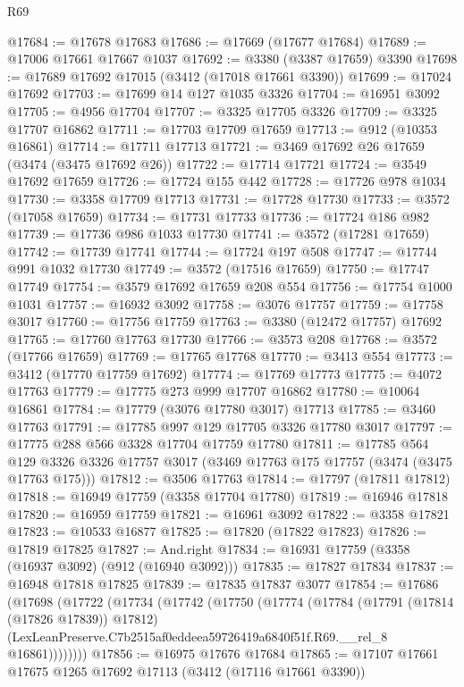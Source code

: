 \begin{lexlean}{R69}
\begin{coremodule}
@17684 := @17678 @17683
@17686 := @17669 (@17677 @17684)
@17689 := @17006 @17661 @17667 @1037
@17692 := @3380 (@3387 @17659) @3390
@17698 := @17689 @17692 @17015 (@3412 (@17018 @17661 @3390))
@17699 := @17024 @17692
@17703 := @17699 @14 @127 @1035 @3326
@17704 := @16951 @3092
@17705 := @4956 @17704
@17707 := @3325 @17705 @3326
@17709 := @3325 @17707 @16862
@17711 := @17703 @17709 @17659
@17713 := @912 (@10353 @16861)
@17714 := @17711 @17713
@17721 := @3469 @17692 @26 @17659 (@3474 (@3475 @17692 @26))
@17722 := @17714 @17721
@17724 := @3549 @17692 @17659
@17726 := @17724 @155 @442
@17728 := @17726 @978 @1034
@17730 := @3358 @17709 @17713
@17731 := @17728 @17730
@17733 := @3572 (@17058 @17659)
@17734 := @17731 @17733
@17736 := @17724 @186 @982
@17739 := @17736 @986 @1033 @17730
@17741 := @3572 (@17281 @17659)
@17742 := @17739 @17741
@17744 := @17724 @197 @508
@17747 := @17744 @991 @1032 @17730
@17749 := @3572 (@17516 @17659)
@17750 := @17747 @17749
@17754 := @3579 @17692 @17659 @208 @554
@17756 := @17754 @1000 @1031
@17757 := @16932 @3092
@17758 := @3076 @17757
@17759 := @17758 @3017
@17760 := @17756 @17759
@17763 := @3380 (@12472 @17757) @17692
@17765 := @17760 @17763 @17730
@17766 := @3573 @208
@17768 := @3572 (@17766 @17659)
@17769 := @17765 @17768
@17770 := @3413 @554
@17773 := @3412 (@17770 @17759 @17692)
@17774 := @17769 @17773
@17775 := @4072 @17763
@17779 := @17775 @273 @999 @17707 @16862
@17780 := @10064 @16861
@17784 := @17779 (@3076 @17780 @3017) @17713
@17785 := @3460 @17763
@17791 := @17785 @997 @129 @17705 @3326 @17780 @3017
@17797 := @17775 @288 @566 @3328 @17704 @17759 @17780
@17811 := @17785
    @564
    @129
    @3326
    @3326
    @17757
    @3017
    (@3469 @17763 @175 @17757 (@3474 (@3475 @17763 @175)))
@17812 := @3506 @17763
@17814 := @17797 (@17811 @17812)
@17818 := @16949 @17759 (@3358 @17704 @17780)
@17819 := @16946 @17818
@17820 := @16959 @17759
@17821 := @16961 @3092
@17822 := @3358 @17821
@17823 := @10533 @16877
@17825 := @17820 (@17822 @17823)
@17826 := @17819 @17825
@17827 := And.right
@17834 := @16931 @17759 (@3358 (@16937 @3092) (@912 (@16940 @3092)))
@17835 := @17827 @17834
@17837 := @16948 @17818 @17825
@17839 := @17835 @17837 @3077
@17854 := @17686
    (@17698
      (@17722
        (@17734
          (@17742
            (@17750
              (@17774
                (@17784
                  (@17791 (@17814 (@17826 @17839)) @17812)
                  (LexLeanPreserve.C7b2515af0eddeea59726419a6840f51f.R69.__rel_8 @16861))))))))
@17856 := @16975 @17676 @17684
@17865 := @17107 @17661 @17675 @1265 @17692 @17113 (@3412 (@17116 @17661 @3390))

\end{coremodule}
\end{lexlean}
